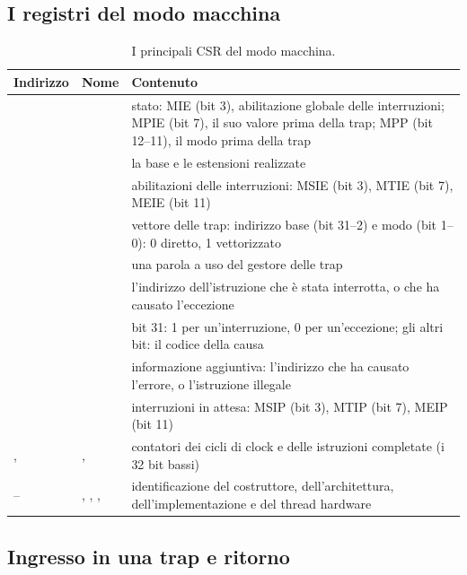 \subsection{I registri del modo macchina}

\begin{table}[htb]
\centering\small
\caption{I principali CSR del modo macchina.}\label{tab:rv:csr}
\begin{tabularx}{\textwidth}{@{}llL@{}}
\toprule
\textbf{Indirizzo} & \textbf{Nome} & \textbf{Contenuto}\\
\midrule
{} &  & stato: MIE (bit 3), abilitazione globale delle interruzioni; MPIE (bit 7), il suo valore prima della trap; MPP (bit 12--11), il modo prima della trap\\
 &  & la base e le estensioni realizzate\\
 &  & abilitazioni delle interruzioni: MSIE (bit 3), MTIE (bit 7), MEIE (bit 11)\\
 &  & vettore delle trap: indirizzo base (bit 31--2) e modo (bit 1--0): 0 diretto, 1 vettorizzato\\
 &  & una parola a uso del gestore delle trap\\
 &  & l'indirizzo dell'istruzione che è stata interrotta, o che ha causato l'eccezione\\
 &  & bit 31: 1 per un'interruzione, 0 per un'eccezione; gli altri bit: il codice della causa\\
 &  & informazione aggiuntiva: l'indirizzo che ha causato l'errore, o l'istruzione illegale\\
 &  & interruzioni in attesa: MSIP (bit 3), MTIP (bit 7), MEIP (bit 11)\\
,  & ,  & contatori dei cicli di clock e delle istruzioni completate (i 32 bit bassi)\\
-- & , , ,  & identificazione del costruttore, dell'architettura, dell'implementazione e del thread hardware\\
\bottomrule
\end{tabularx}
\end{table}

\subsection{Ingresso in una trap e ritorno}


